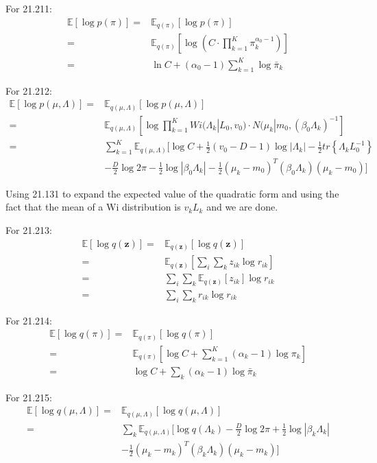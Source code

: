 \documentclass[UTF8]{ctexart}
\begin{document}
For 21.211:
\begin{align}
\mathbb{E}[\log p(\pi)]=&\mathbb{E}_{q(\pi)}[\log p(\pi)] \nonumber \\
=&\mathbb{E}_{q(\pi)}[\log (C\cdot \prod_{k=1}^{K}\pi_{k}^{\alpha_{0}-1})]\nonumber \\
=&\ln C + (\alpha_{0}-1)\sum_{k=1}^{K}\log \bar{\pi}_{k} \nonumber
\end{align}

For 21.212:
\begin{align}
\mathbb{E}[\log p(\mu,\Lambda)]=&\mathbb{E}_{q(\mu,\Lambda)}[\log p(\mu,\Lambda)] \nonumber \\
=&\mathbb{E}_{q(\mu,\Lambda)}[\log \prod_{k=1}^{K}Wi(\Lambda_{k}|L_{0},v_{0})\cdot N(\mu_{k}|m_{0},(\beta_{0}\Lambda_{k})^{-1}]\nonumber \\
=&\sum_{k=1}^{K}\mathbb{E}_{q(\mu,\Lambda)}[ \log C + \frac{1}{2}(v_{0}-D-1)\log |\Lambda_{k}| -\frac{1}{2}tr\left\{ \Lambda_{k}L_{0}^{-1} \right\}\nonumber \\
\ & - \frac{D}{2}\log 2 \pi - \frac{1}{2}\log |\beta_{0}\Lambda_{k}| -\frac{1}{2}(\mu_{k}-m_{0})^{T}(\beta_{0}\Lambda_{k})(\mu_{k}-m_{0}) ]\nonumber
\end{align}

Using 21.131 to expand the expected value of the quadratic form and using the fact that the mean of a Wi distribution is $v_{k}L_{k}$ and we are done.

For 21.213:
\begin{align}
\mathbb{E}[\log q(\textbf{z})]=& \mathbb{E}_{q(\textbf{z})}[\log q(\textbf{z})] \nonumber \\
=&\mathbb{E}_{q(\textbf{z})}[\sum_{i}\sum_{k}z_{ik}\log r_{ik}]\nonumber \\
=&\sum_{i}\sum_{k} \mathbb{E}_{q(\textbf{z})}[z_{ik}]\log r_{ik}\nonumber \\
=& \sum_{i}\sum_{k} r_{ik}\log r_{ik}\nonumber
\end{align}

For 21.214:
\begin{align}
\mathbb{E}[\log q(\pi)]=&\mathbb{E}_{q(\pi)}[\log q(\pi)] \nonumber \\
=&\mathbb{E}_{q(\pi)}[\log C + \sum_{k=1}^{K}(\alpha_{k}-1)\log \pi_{k}] \nonumber \\
=&\log C + \sum_{k}(\alpha_{k}-1)\log \bar{\pi}_{k} \nonumber
\end{align}

For 21.215:
\begin{align}
\mathbb{E}[\log q(\mu,\Lambda)]=& \mathbb{E}_{q(\mu,\Lambda)}[\log q(\mu,\Lambda)] \nonumber \\
=&\sum_{k}\mathbb{E}_{q(\mu,\Lambda)}[\log q(\Lambda_{k})-\frac{D}{2}\log 2\pi +\frac{1}{2}\log |\beta_{k}\Lambda_{k}|\nonumber \\
\ &-\frac{1}{2}(\mu_{k}-m_{k})^{T}(\beta_{k}\Lambda_{k})(\mu_{k}-m_{k})  ]\nonumber
\end{align}
\end{document}
